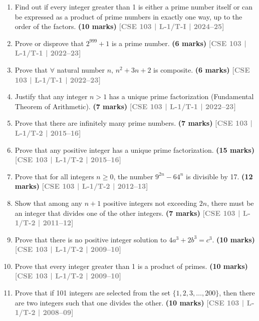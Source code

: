 \documentclass[12pt,a3paper]{article}
\newcommand{\yr}[1]{\hfill\textcolor{gray}{\small\textbf{[#1]}}}
\newcommand{\mk}[1]{\textcolor{orange!70!black}{\small\textbf{(#1 marks)}}}
\begin{document}
\begin{enumerate}

\item Find out if every integer greater than 1 is either a prime number itself or can be expressed as a product of prime numbers in exactly one way, up to the order of the factors.
\mk{10} \yr{CSE 103 | L-1/T-I | 2024--25}

\item Prove or disprove that $2^{999} + 1$ is a prime number.
\mk{6} \yr{CSE 103 | L-1/T-1 | 2022--23}

\item Prove that $\forall$ natural number $n$, $n^2 + 3n + 2$ is composite.
\mk{6} \yr{CSE 103 | L-1/T-1 | 2022--23}

\item Justify that any integer $n > 1$ has a unique prime factorization (Fundamental Theorem of Arithmetic).
\mk{7} \yr{CSE 103 | L-1/T-1 | 2022--23}

\item Prove that there are infinitely many prime numbers.
\mk{7} \yr{CSE 103 | L-1/T-2 | 2015--16}

\item Prove that any positive integer has a unique prime factorization.
\mk{15} \yr{CSE 103 | L-1/T-2 | 2015--16}

\item Prove that for all integers $n \geq 0$, the number $9^{2n} - 64^n$ is divisible by 17.
\mk{12} \yr{CSE 103 | L-1/T-2 | 2012--13}  


\item Show that among any $n + 1$ positive integers not exceeding $2n$, there must be an integer that divides one of the other integers.
\mk{7} \yr{CSE 103 | L-1/T-2 | 2011--12}

\item Prove that there is no positive integer solution to $4a^3 + 2b^3 = c^3$.
\mk{10} \yr{CSE 103 | L-1/T-2 | 2009--10}

\item Prove that every integer greater than 1 is a product of primes.
\mk{10} \yr{CSE 103 | L-1/T-2 | 2009--10}

\item Prove that if 101 integers are selected from the set $\{1, 2, 3, \ldots, 200\}$, then there are two integers such that one divides the other.
\mk{10} \yr{CSE 103 | L-1/T-2 | 2008--09}

\end{enumerate}
\end{document}
